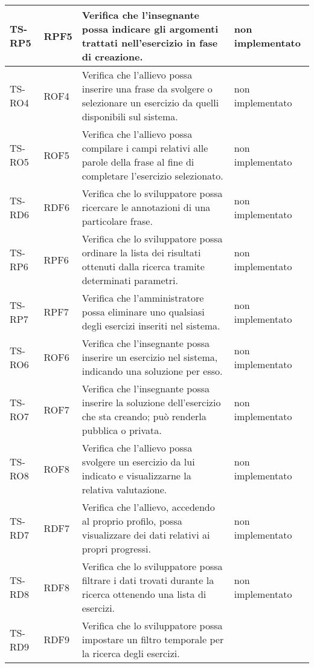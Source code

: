 \begin{longtable}{|>{\centering\arraybackslash}m{1.6cm}|>{\centering\arraybackslash}m{1.7cm}|m{6.41cm}|>{\centering\arraybackslash}m{3.1cm}|}
		\rowcolor{LightGray}
		TS-RP5		
		& RPF5 
		& Verifica che l'insegnante possa indicare gli argomenti trattati nell'esercizio in fase di creazione.
		& non implementato\\ \hline
		\rowcolor{white}
		TS-RO4		
		& ROF4 
		& Verifica che l'allievo possa inserire una frase da svolgere o selezionare un esercizio da quelli disponibili sul sistema.
		& non implementato\\ \hline
		\rowcolor{LightGray}
		TS-RO5		
		& ROF5 
		& Verifica che l'allievo possa compilare i campi relativi alle parole della frase al fine di completare l'esercizio selezionato.
		& non implementato\\ \hline
		\rowcolor{white}
		TS-RD6		
		& RDF6 
		& Verifica che lo sviluppatore possa ricercare le annotazioni di una particolare frase.
		& non implementato\\ \hline
		\rowcolor{LightGray}
		TS-RP6		
		& RPF6 
		& Verifica che lo sviluppatore possa ordinare la lista dei risultati ottenuti dalla ricerca tramite determinati parametri. 
		& non implementato\\ \hline
		\rowcolor{white}
		TS-RP7		
		& RPF7 
		& Verifica che l'amministratore possa eliminare uno qualsiasi degli esercizi inseriti nel sistema.
		& non implementato\\ \hline
		\rowcolor{LightGray}
		TS-RO6		
		& ROF6 
		& Verifica che l'insegnante possa inserire un esercizio nel sistema, indicando una soluzione per esso. 
		& non implementato\\ \hline
		\rowcolor{white}
		TS-RO7		
		& ROF7 
		& Verifica che l'insegnante possa inserire la soluzione dell'esercizio che sta creando; può renderla pubblica o privata. 
		& non implementato\\ \hline
		\rowcolor{LightGray}
		TS-RO8		
		& ROF8 
		& Verifica che l'allievo possa svolgere un esercizio da lui indicato e visualizzarne la relativa valutazione. 
		& non implementato\\ \hline
		\rowcolor{white}
		TS-RD7		
		& RDF7 
		& Verifica che l'allievo, accedendo al proprio profilo, possa visualizzare dei dati relativi ai propri progressi. 
		& non implementato\\ \hline
		\rowcolor{LightGray}
		TS-RD8		
		& RDF8 
		& Verifica che lo sviluppatore possa filtrare i dati trovati durante la ricerca ottenendo una lista di esercizi. 
		& non implementato\\ \hline
		\rowcolor{white}
		TS-RD9
		& RDF9 
		& Verifica che lo sviluppatore possa impostare un filtro temporale per la ricerca degli esercizi.

\end{longtable}
